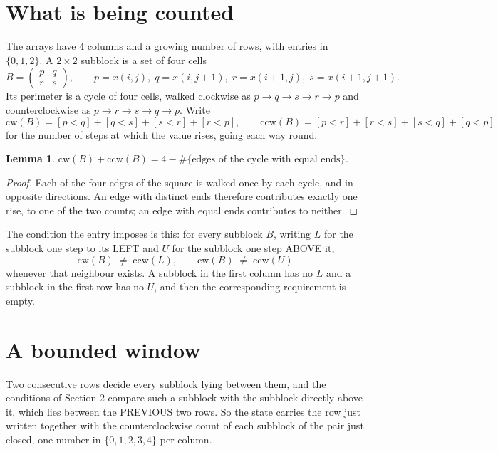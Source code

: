 \documentclass[11pt,a4paper]{article}
\theoremstyle{plain}
\newtheorem{lemma}[theorem]{Lemma}
\theoremstyle{definition}
\begin{document}
\section{What is being counted}

The arrays have $4$ columns and a growing number of rows, with entries in $\{0,1,2\}$. A
$2\times2$ subblock is a set of four cells
\[
B=\begin{pmatrix} p & q \\ r & s \end{pmatrix},
\qquad p=x(i,j),\; q=x(i,j+1),\; r=x(i+1,j),\; s=x(i+1,j+1).
\]
Its perimeter is a cycle of four cells, walked clockwise as $p\to q\to s\to r\to p$ and
counterclockwise as $p\to r\to s\to q\to p$. Write
\[
\mathrm{cw}(B)=[p<q]+[q<s]+[s<r]+[r<p],\qquad
\mathrm{ccw}(B)=[p<r]+[r<s]+[s<q]+[q<p]
\]
for the number of steps at which the value rises, going each way round.

\begin{lemma}\label{lem:sum}
$\mathrm{cw}(B)+\mathrm{ccw}(B)=4-\#\{\text{edges of the cycle with equal ends}\}$.
\end{lemma}

\begin{proof}
Each of the four edges of the square is walked once by each cycle, and in opposite directions.
An edge with distinct ends therefore contributes exactly one rise, to one of the two counts;
an edge with equal ends contributes to neither.
\end{proof}

The condition the entry imposes is this: for every subblock $B$, writing $L$ for the subblock one step to its LEFT and $U$ for the subblock one step ABOVE it,
\[
\mathrm{cw}(B)\;\ne\;\mathrm{ccw}(L),\qquad \mathrm{cw}(B)\;\ne\;\mathrm{ccw}(U)
\]
whenever that neighbour exists. A subblock in the first column has no $L$ and a subblock in the first row has no $U$, and then the corresponding requirement is empty.

\section{A bounded window}

Two consecutive rows decide every subblock lying between them, and the conditions of Section 2 compare such a subblock with the subblock directly above it, which lies between the PREVIOUS two rows. So the state carries the row just written together with the counterclockwise count of each subblock of the pair just closed, one number in $\{0,1,2,3,4\}$ per column.
\end{document}
